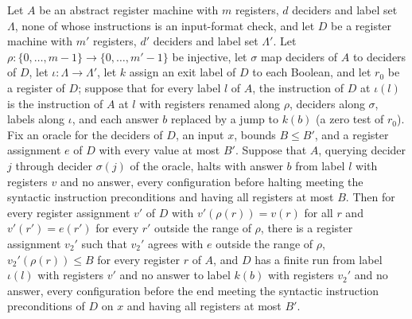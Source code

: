 \begin{theorem}
\label{Complexity.LogProg.AHalt.embed_guardLe}
\leanok
{}
Let $A$ be an abstract register machine with $m$ registers, $d$ deciders and label set
$\Lambda$, none of whose instructions is an input-format check, and let $D$ be a
register machine with $m'$ registers, $d'$ deciders and label set $\Lambda'$. Let
$\rho:\{0,\ldots,m-1\}\to\{0,\ldots,m'-1\}$ be injective, let $\sigma$ map deciders of $A$
to deciders of $D$, let $\iota:\Lambda\to\Lambda'$, let $k$ assign an exit label of $D$
to each Boolean, and let $r_0$ be a register of $D$; suppose that for every label $l$ of
$A$, the instruction of $D$ at $\iota(l)$ is the instruction of $A$ at $l$ with registers
renamed along $\rho$, deciders along $\sigma$, labels along $\iota$, and each answer $b$
replaced by a jump to $k(b)$ (a zero test of $r_0$). Fix an oracle for the deciders of
$D$, an input $x$, bounds $B\le B'$, and a register assignment $e$ of $D$ with every
value at most $B'$. Suppose that $A$, querying decider $j$ through decider $\sigma(j)$ of
the oracle, halts with answer $b$ from label $l$ with registers $v$ and no answer, every
configuration before halting meeting the syntactic instruction preconditions and having
all registers at most $B$. Then for every register assignment $v'$ of $D$ with
$v'(\rho(r))=v(r)$ for all $r$ and $v'(r')=e(r')$ for every $r'$ outside the range of
$\rho$, there is a register assignment $v_2'$ such that $v_2'$ agrees with $e$ outside the
range of $\rho$, $v_2'(\rho(r))\le B$ for every register $r$ of $A$, and $D$ has a finite
run from label $\iota(l)$ with registers $v'$ and no answer to label $k(b)$ with registers
$v_2'$ and no answer, every configuration before the end meeting the syntactic
instruction preconditions of $D$ on $x$ and having all registers at most $B'$.
\end{theorem}
